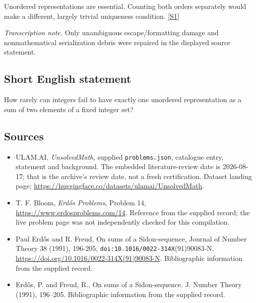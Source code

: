 \documentclass[11pt,a4paper]{article}
\newcommand{\sref}[2]{\hyperlink{source:#1:#2}{[S#2]}}
\begin{document}
Unordered representations are essential. Counting both orders separately would make a different, largely trivial uniqueness condition. \sref{statement}{1}

{\small\emph{Transcription note.} Only unambiguous escape/formatting damage and nonmathematical serialization debris were repaired in the displayed source statement.}

\subsection{Short English statement}

How rarely can integers fail to have exactly one unordered representation as a sum of two elements of a fixed integer set?

\subsection{Sources}

{\small

\begin{itemize}

\item[\hypertarget{source:statement:1}{S1}] ULAM.AI, \emph{UnsolvedMath}, supplied \texttt{problems.json}, catalogue entry, statement and background. The embedded literature-review date is 2026-08-17; that is the archive’s review date, not a fresh certification. Dataset landing page: \url{https://huggingface.co/datasets/ulamai/UnsolvedMath}.

\item[\hypertarget{source:statement:2}{S2}] T. F. Bloom, \emph{Erdős Problems}, Problem 14, \url{https://www.erdosproblems.com/14}. Reference from the supplied record; the live problem page was not independently checked for this compilation.

\item[\hypertarget{source:statement:3}{S3}] Paul Erdős and R. Freud, On sums of a Sidon-sequence, Journal of Number Theory 38 (1991), 196-205, \nolinkurl{doi:10.1016/0022-314X}(91)90083-N. \url{https://doi.org/10.1016/0022-314X(91)90083-N}. Bibliographic information from the supplied record.

\item[\hypertarget{source:statement:4}{S4}] Erd\H{o}s, P. and Freud, R., On sums of a {S}idon-sequence. J. Number Theory (1991), 196--205. Bibliographic information from the supplied record.

\end{itemize}

}

\label{end:statement}
\end{document}
